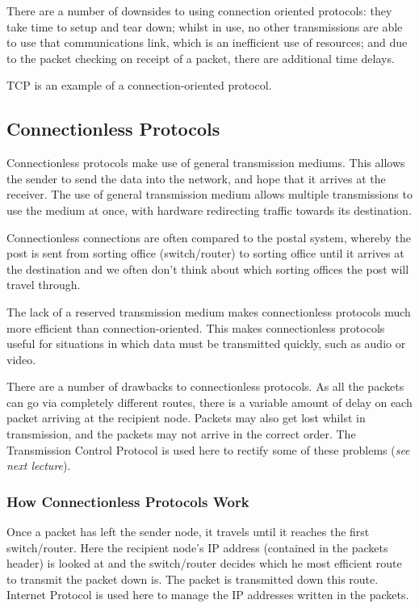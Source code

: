There are a number of downsides to using connection oriented protocols: they take time to setup and tear down; whilst in use, no other transmissions are able to use that communications link, which is an inefficient use of resources; and due to the packet checking on receipt of a packet, there are additional time delays.

TCP is an example of a connection-oriented protocol.

\subsection*{Connectionless Protocols}
Connectionless protocols make use of general transmission mediums. This allows the sender to send the data into the network, and hope that it arrives at the receiver. The use of general transmission medium allows multiple transmissions to use the medium at once, with hardware redirecting traffic towards its destination. 

Connectionless connections are often compared to the postal system, whereby the post is sent from sorting office (switch/router) to sorting office until it arrives at the destination and we often don't think about which sorting offices the post will travel through.

The lack of a reserved transmission medium makes connectionless protocols much more efficient than connection-oriented. This makes connectionless protocols useful for situations in which data must be transmitted quickly, such as audio or video.

There are a number of drawbacks to connectionless protocols. As all the packets can go via completely different routes, there is a variable amount of delay on each packet arriving at the recipient node. Packets may also get lost whilst in transmission, and the packets may not arrive in the correct order. The Transmission Control Protocol is used here to rectify some of these problems (\textit{see next lecture}). 

\subsubsection*{How Connectionless Protocols Work}
Once a packet has left the sender node, it travels until it reaches the first switch/router. Here the recipient node's IP address (contained in the packets header) is looked at and the switch/router decides which he most efficient route to transmit the packet down is. The packet is transmitted down this route. Internet Protocol is used here to manage the IP addresses written in the packets. 

